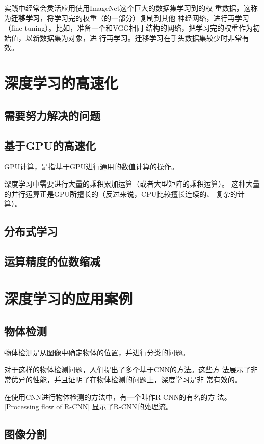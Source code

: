 \begin{tcolorbox}
    实践中经常会灵活应用使用ImageNet这个巨大的数据集学习到的权
    重数据，这称为\textbf{迁移学习}，将学习完的权重（的一部分）复制到其他
    神经网络，进行再学习（fine tuning）。比如，准备一个和VGG相同
    结构的网络，把学习完的权重作为初始值，以新数据集为对象，进
    行再学习。迁移学习在手头数据集较少时非常有效。
\end{tcolorbox}

\section{深度学习的高速化}
\subsection{需要努力解决的问题}
\subsection{基于GPU的高速化}
GPU计算，是指基于GPU进行通用的数值计算的操作。

深度学习中需要进行大量的乘积累加运算（或者大型矩阵的乘积运算）。
这种大量的并行运算正是GPU所擅长的（反过来说，CPU比较擅长连续的、
复杂的计算）。
\subsection{分布式学习}
\subsection{运算精度的位数缩减}
\section{深度学习的应用案例}
\subsection{物体检测}
物体检测是从图像中确定物体的位置，并进行分类的问题。

对于这样的物体检测问题，人们提出了多个基于CNN的方法。这些方
法展示了非常优异的性能，并且证明了在物体检测的问题上，深度学习是非
常有效的。

在使用CNN进行物体检测的方法中，有一个叫作R-CNN的有名的方
法。\autoref{Processing flow of R-CNN} 显示了R-CNN的处理流。
\subsection{图像分割}
